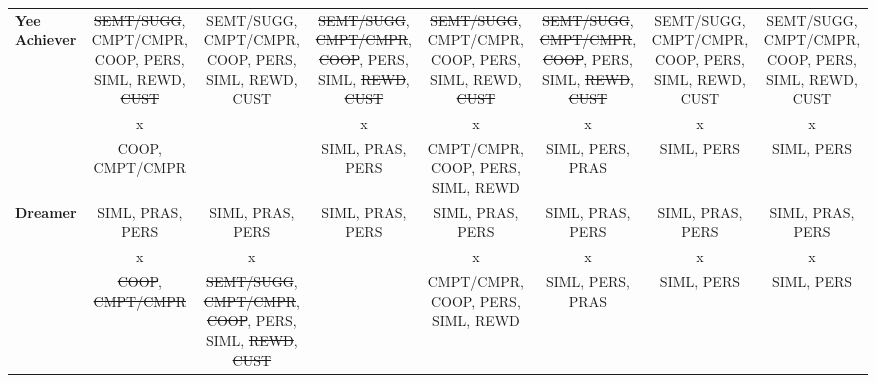 \begin{landscape}
\begin{quadro}[htb]
\begin{tabular}{|l|c|c|c|c|c|c|c|}
\multirow{3}{*}{\textbf{Yee Achiever}}& 
\multicolumn{1}{|p{2.5cm}|}{\centering \mbox{\st{SEMT/SUGG}}, \mbox{CMPT/CMPR}, COOP, PERS, SIML, REWD, \st{CUST}}&%
\multicolumn{1}{|p{2.5cm}|}{\centering \mbox{SEMT/SUGG}, \mbox{CMPT/CMPR}, COOP, PERS, SIML, REWD, CUST} &%
\multicolumn{1}{|p{2.5cm}|}{\centering \mbox{\st{SEMT/SUGG}}, \mbox{\st{CMPT/CMPR}}, \st{COOP}, PERS, SIML, \st{REWD}, \st{CUST}}&%
\multicolumn{1}{|p{2.5cm}|}{\centering \mbox{\st{SEMT/SUGG}}, \mbox{CMPT/CMPR}, COOP, PERS, SIML, REWD, \st{CUST}}&%
\multicolumn{1}{|p{2.5cm}|}{\centering \mbox{\st{SEMT/SUGG}}, \mbox{\st{CMPT/CMPR}}, \st{COOP}, PERS, SIML, \st{REWD}, \st{CUST}}&%
\multicolumn{1}{|p{2.5cm}|}{\centering \mbox{SEMT/SUGG}, \mbox{CMPT/CMPR}, COOP, PERS, SIML, REWD, CUST}&%
\multicolumn{1}{|p{2.5cm}|}{\centering \mbox{SEMT/SUGG}, \mbox{CMPT/CMPR}, COOP, PERS, SIML, REWD, CUST}\tabularnewline
& 
\multicolumn{1}{|p{2.5cm}|}{\centering x}&
&
\multicolumn{1}{|p{2.5cm}|}{\centering x}&
\multicolumn{1}{|p{2.5cm}|}{\centering x}&
\multicolumn{1}{|p{2.5cm}|}{\centering x}&
\multicolumn{1}{|p{2.5cm}|}{\centering x}&
\multicolumn{1}{|p{2.5cm}|}{\centering x}\tabularnewline
& 
\multicolumn{1}{|p{2.5cm}|}{\centering COOP, CMPT/CMPR}&%
&%
\multicolumn{1}{|p{2.5cm}|}{\centering SIML, PRAS, PERS}&%
\multicolumn{1}{|p{2.5cm}|}{\centering CMPT/CMPR, COOP, PERS, SIML, REWD}&%
\multicolumn{1}{|p{2.5cm}|}{\centering SIML, PERS, PRAS}&%
\multicolumn{1}{|p{2.5cm}|}{\centering SIML, PERS}&%
\multicolumn{1}{|p{2.5cm}|}{\centering SIML, PERS}\tabularnewline
\hline


\multirow{3}{*}{\textbf{Dreamer}}& 
\multicolumn{1}{|p{2.5cm}|}{\centering SIML, PRAS, PERS}&
\multicolumn{1}{|p{2.5cm}|}{\centering SIML, PRAS, PERS} &
\multicolumn{1}{|p{2.5cm}|}{\centering SIML, PRAS, PERS}&
\multicolumn{1}{|p{2.5cm}|}{\centering SIML, PRAS, PERS}&
\multicolumn{1}{|p{2.5cm}|}{\centering SIML, PRAS, PERS}&
\multicolumn{1}{|p{2.5cm}|}{\centering SIML, PRAS, PERS}&
\multicolumn{1}{|p{2.5cm}|}{\centering SIML, PRAS, PERS}\tabularnewline
& 
\multicolumn{1}{|p{2.5cm}|}{\centering x}&
\multicolumn{1}{|p{2.5cm}|}{\centering x}&
&
\multicolumn{1}{|p{2.5cm}|}{\centering x}&
\multicolumn{1}{|p{2.5cm}|}{\centering x}&
\multicolumn{1}{|p{2.5cm}|}{\centering x}&
\multicolumn{1}{|p{2.5cm}|}{\centering x}\tabularnewline
& 
\multicolumn{1}{|p{2.5cm}|}{\centering \st{COOP}, \st{CMPT/CMPR}}&%
\multicolumn{1}{|p{2.5cm}|}{\centering \mbox{\st{SEMT/SUGG}}, \mbox{\st{CMPT/CMPR}}, \st{COOP}, PERS, SIML, \st{REWD}, \st{CUST}}&%
&%
\multicolumn{1}{|p{2.5cm}|}{\centering CMPT/CMPR, COOP, PERS, SIML, REWD}&%
\multicolumn{1}{|p{2.5cm}|}{\centering SIML, PERS, PRAS}&%
\multicolumn{1}{|p{2.5cm}|}{\centering SIML, PERS}&%
\multicolumn{1}{|p{2.5cm}|}{\centering SIML, PERS}\tabularnewline
\hline



\end{tabular}
\end{quadro}
\end{landscape}
